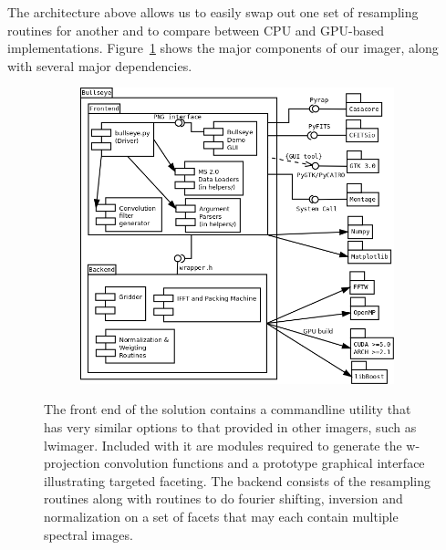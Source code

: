 The architecture above allows us to easily swap out one set of resampling routines for another and to compare between CPU and GPU-based implementations. Figure~\ref{fig_arch} shows
the major components of our imager, along with several major dependencies. 
\begin{figure}[h]
  \begin{mdframed}
    \centering
    \begin{subfigure}[b]{0.66\textwidth}
      \centering
      \includegraphics[width=\textwidth]{images/bullseye_arch.png}
      \caption{}
    \end{subfigure}  
    \caption[Bullseye Architecture]{The front end of the solution contains a commandline utility that has very similar options to that provided in other imagers, such as lwimager.
    Included with it are modules required to generate the w-projection convolution functions and a prototype graphical interface illustrating targeted faceting. The backend consists
    of the resampling routines along with routines to do fourier shifting, inversion and normalization on a set of facets that may each contain multiple spectral images.}
    \label{fig_arch}
  \end{mdframed}
\end{figure}

